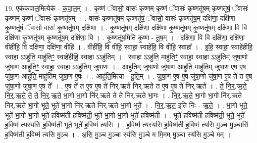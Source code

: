 \documentclass[17pt]{extarticle}
\begin{document}
19. एक॑कपाल॒मित्येक॑ - क॒पा॒ल॒म् । . कृ॒ष्णं ॅवासो॒ वासः॑ कृ॒ष्णम् कृ॒ष्णं ॅवासः॑ कृ॒ष्णतू॑षम् कृ॒ष्णतू॑षं॒ ॅवासः॑ कृ॒ष्णम् कृ॒ष्णं ॅवासः॑ कृ॒ष्णतू॑षम् । . वासः॑ कृ॒ष्णतू॑षम् कृ॒ष्णतू॑षं॒ ॅवासो॒ वासः॑ कृ॒ष्णतू॑ष॒म् दक्षि॑णा॒ दक्षि॑णा कृ॒ष्णतू॑षं॒ ॅवासो॒ वासः॑ कृ॒ष्णतू॑ष॒म् दक्षि॑णा । . कृ॒ष्णतू॑ष॒म् दक्षि॑णा॒ दक्षि॑णा कृ॒ष्णतू॑षम् कृ॒ष्णतू॑ष॒म् दक्षि॑णा॒ वि वि दक्षि॑णा कृ॒ष्णतू॑षम् कृ॒ष्णतू॑ष॒म् दक्षि॑णा॒ वि । . कृ॒ष्णतू॑ष॒मिति॑ कृ॒ष्ण - तू॒ष॒म् । . दक्षि॑णा॒ वि वि दक्षि॑णा॒ दक्षि॑णा॒ वीही॑हि॒ वि दक्षि॑णा॒ दक्षि॑णा॒ वीहि॑ । . वीही॑हि॒ वि वीहि॒ स्वाहा॒ स्वाहे॑हि॒ वि वीहि॒ स्वाहा᳚ । . इ॒हि॒ स्वाहा॒ स्वाहे॑हीहि॒ स्वाहा ऽऽहु॑ति॒ माहु॑तिꣳ॒॒ स्वाहे॑हीहि॒ स्वाहा ऽऽहु॑तिम् । . स्वाहा ऽऽहु॑ति॒ माहु॑तिꣳ॒॒ स्वाहा॒ स्वाहा ऽऽहु॑तिम् जुषा॒णो जु॑षा॒ण आहु॑तिꣳ॒॒ स्वाहा॒ स्वाहा ऽऽहु॑तिम् जुषा॒णः । . आहु॑तिम् जुषा॒णो जु॑षा॒ण आहु॑ति॒ माहु॑तिम् जुषा॒ण ए॒ष ए॒ष जु॑षा॒ण आहु॑ति॒ माहु॑तिम् जुषा॒ण ए॒षः । . आहु॑ति॒मित्या - हु॒ति॒म् । . जु॒षा॒ण ए॒ष ए॒ष जु॑षा॒णो जु॑षा॒ण ए॒ष ते॑ त ए॒ष जु॑षा॒णो जु॑षा॒ण ए॒ष ते᳚ । . ए॒ष ते॑ त ए॒ष ए॒ष ते॑ निर्.ऋते निर्.ऋते त ए॒ष ए॒ष ते॑ निर्.ऋते । . ते॒ नि॒र्॒.ऋ॒ते॒ नि॒र्॒.ऋ॒ते॒ ते॒ ते॒ नि॒र्॒.ऋ॒ते॒ भा॒गो भा॒गो नि॑र्.ऋते ते ते निर्.ऋते भा॒गः । . नि॒र्॒.ऋ॒ते॒ भा॒गो भा॒गो नि॑र्.ऋते निर्.ऋते भा॒गो भूते॒ भूते॑ भा॒गो नि॑र्.ऋते निर्.ऋते भा॒गो भूते᳚ । . नि॒र्॒.ऋ॒त॒ इति॑ निः - ऋ॒ते॒ । . भा॒गो भूते॒ भूते॑ भा॒गो भा॒गो भूते॑ ह॒विष्म॑ती ह॒विष्म॑ती॒ भूते॑ भा॒गो भा॒गो भूते॑ ह॒विष्म॑ती । . भूते॑ ह॒विष्म॑ती ह॒विष्म॑ती॒ भूते॒ भूते॑ ह॒विष्म॑ त्यस्यसि ह॒विष्म॑ती॒ भूते॒ भूते॑ ह॒विष्म॑ त्यसि । . ह॒विष्म॑ त्यस्यसि ह॒विष्म॑ती ह॒विष्म॑ त्यसि मु॒ञ्च मु॒ञ्चासि॑ ह॒विष्म॑ती ह॒विष्म॑ त्यसि मु॒ञ्च । . अ॒सि॒ मु॒ञ्च मु॒ञ्चा स्य॑सि मु॒ञ्चे म मि॒मम् मु॒ञ्चा स्य॑सि मु॒ञ्चे मम् । \newline
\end{document}
